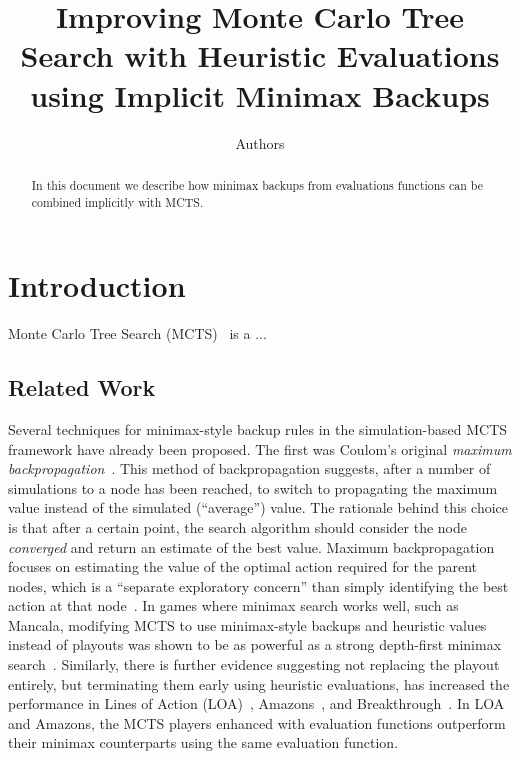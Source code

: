 \documentclass{article}
\begin{document}
\title{Improving Monte Carlo Tree Search with Heuristic Evaluations using Implicit Minimax Backups}

\author{Authors}

\maketitle

\begin{abstract}
In this document we describe how minimax backups from evaluations functions can be combined implicitly 
with MCTS. 
\end{abstract}

\section{Introduction}

Monte Carlo Tree Search (MCTS)~\cite{mctssurvey,Coulom06Efficient,Kocsis06Bandit} is a ... 

\subsection{Related Work}

Several techniques for minimax-style backup rules in the simulation-based MCTS framework have already been proposed. 
The first was Coulom's original {\it maximum backpropagation}~\cite{Coulom06Efficient}. This method of backpropagation
suggests, after a number of simulations to a node has been reached, to switch to propagating the maximum value instead 
of the simulated (``average'') value. 
The rationale behind this choice is that after a certain point, the search algorithm should consider the node
{\it converged} and return an estimate of the best value. 
Maximum backpropagation focuses on estimating the value of the optimal action required for the parent nodes, which is a
``separate exploratory concern'' than simply identifying the best action at that node~\cite{Feldman13Theoretically}.
In games where minimax search works well, such as Mancala, modifying MCTS to 
use minimax-style backups and heuristic values instead of playouts was shown to be as powerful as a strong 
depth-first minimax search~\cite{Ramanujan11Tradeoffs}.
Similarly, there is further evidence suggesting not replacing the playout entirely, but terminating them early 
using heuristic evaluations, has increased the performance in Lines of Action (LOA)~\cite{Winands10MCTS-LOA}, 
Amazons~\cite{Lorentz08Amazons}, and Breakthrough~\cite{Lorentz13Breakthrough}. In LOA and Amazons, the 
MCTS players enhanced with evaluation functions outperform their minimax counterparts using the same evaluation function.
\end{document}
